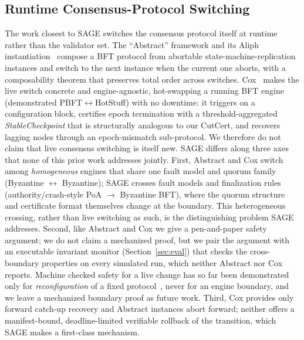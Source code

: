 \documentclass[journal]{IEEEtran}
\theoremstyle{remark}
\begin{document}
\subsection{Runtime Consensus-Protocol Switching}
The work closest to SAGE switches the consensus protocol itself at runtime rather than the
validator set. The ``Abstract'' framework and its Aliph instantiation~\cite{abstract} compose a
BFT protocol from abortable state-machine-replication instances and switch to the next instance
when the current one aborts, with a composability theorem that preserves total order across
switches. Cox~\cite{cox} makes the live switch concrete and engine-agnostic, hot-swapping a
running BFT engine (demonstrated PBFT$\leftrightarrow$HotStuff) with no downtime: it triggers on
a configuration block, certifies epoch termination with a threshold-aggregated
\emph{StableCheckpoint} that is structurally analogous to our CutCert, and recovers lagging nodes
through an epoch-mismatch sub-protocol. We therefore do not claim that live consensus switching
is itself new. SAGE differs along three axes that none of this prior work addresses jointly.
First, Abstract and Cox switch among \emph{homogeneous} engines that share one fault model and
quorum family (Byzantine $\leftrightarrow$ Byzantine); SAGE crosses fault models and finalization
rules (authority/crash-style PoA $\rightarrow$ Byzantine BFT), where the quorum structure and
certificate format themselves change at the boundary. This heterogeneous crossing, rather than
live switching as such, is the distinguishing problem SAGE addresses. Second, like Abstract and
Cox we give a pen-and-paper safety argument; we do not claim a mechanized proof, but we pair the
argument with an executable invariant monitor (Section~\ref{sec:eval}) that checks the
cross-boundary properties on every simulated run, which neither Abstract nor Cox reports. Machine
checked safety for a live change has so far been demonstrated only for \emph{reconfiguration} of a
fixed protocol~\cite{mongoraft,suilutris}, never for an engine boundary, and we leave a mechanized
boundary proof as future work. Third, Cox provides only forward catch-up recovery and Abstract
instances abort forward; neither offers a manifest-bound, deadline-limited verifiable rollback of
the transition, which SAGE makes a first-class mechanism.
\end{document}

